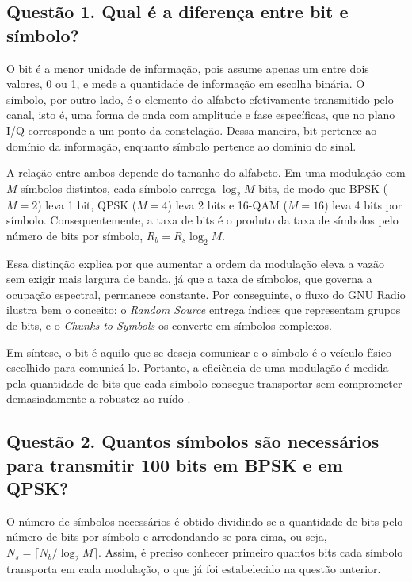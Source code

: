 
\subsection*{Questão 1. Qual é a diferença entre bit e símbolo?}

O bit é a menor unidade de informação, pois assume apenas um entre dois valores, 0 ou 1, e mede a quantidade de informação em escolha binária. O símbolo, por outro lado, é o elemento do alfabeto efetivamente transmitido pelo canal, isto é, uma forma de onda com amplitude e fase específicas, que no plano I/Q corresponde a um ponto da constelação. Dessa maneira, bit pertence ao domínio da informação, enquanto símbolo pertence ao domínio do sinal.

A relação entre ambos depende do tamanho do alfabeto. Em uma modulação com $M$ símbolos distintos, cada símbolo carrega $\log_2 M$ bits, de modo que BPSK ($M=2$) leva 1 bit, QPSK ($M=4$) leva 2 bits e 16-QAM ($M=16$) leva 4 bits por símbolo. Consequentemente, a taxa de bits é o produto da taxa de símbolos pelo número de bits por símbolo, $R_b = R_s \log_2 M$.

Essa distinção explica por que aumentar a ordem da modulação eleva a vazão sem exigir mais largura de banda, já que a taxa de símbolos, que governa a ocupação espectral, permanece constante. Por conseguinte, o fluxo do GNU Radio ilustra bem o conceito: o \textit{Random Source} entrega índices que representam grupos de bits, e o \textit{Chunks to Symbols} os converte em símbolos complexos.

Em síntese, o bit é aquilo que se deseja comunicar e o símbolo é o veículo físico escolhido para comunicá-lo. Portanto, a eficiência de uma modulação é medida pela quantidade de bits que cada símbolo consegue transportar sem comprometer demasiadamente a robustez ao ruído \cite{proakis2008}.

\subsection*{Questão 2. Quantos símbolos são necessários para transmitir 100 bits em BPSK e em QPSK?}

O número de símbolos necessários é obtido dividindo-se a quantidade de bits pelo número de bits por símbolo e arredondando-se para cima, ou seja, $N_s=\lceil N_b/\log_2 M\rceil$. Assim, é preciso conhecer primeiro quantos bits cada símbolo transporta em cada modulação, o que já foi estabelecido na questão anterior.

